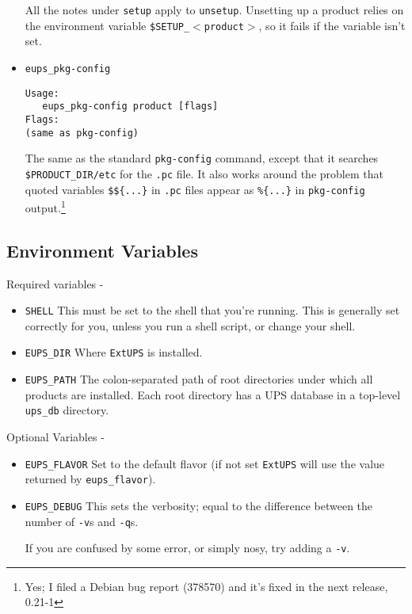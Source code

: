 \documentclass{article}
\newcommand{\code}[1]{\texttt{#1}}
\newcommand{\eups}{\code{ExtUPS}}
\begin{document}
\begin{itemize}
All the notes under \code{setup} apply to
\code{unsetup}. Unsetting up a product relies on the environment
variable \code{\$SETUP\_$<$product$>$}, so it fails if the variable
isn't set.

\item \code{eups\_pkg-config}
\begin{verbatim}
Usage:
   eups_pkg-config product [flags]
Flags:
(same as pkg-config)
\end{verbatim}

The same as the standard \code{pkg-config} command, except that it
searches \code{\$PRODUCT\_DIR/etc} for the \code{.pc} file.  It also
works around the problem that quoted variables \code{\$\$\{...\}}
in \code{.pc} files appear as \code{\%\{...\}} in \code{pkg-config} output.\footnote{
  Yes; I filed a Debian bug report (378570) and it's fixed in the next release, 0.21-1}

\end{itemize}

\subsection{Environment Variables}

Required variables -

\begin{itemize}
  \item \code{SHELL}
    This must be set to the shell that you're running. This is
    generally set correctly for you, unless you run a shell script, or
    change your shell.

  \item \code{EUPS\_DIR}
    Where \eups{} is installed.

  \item \code{EUPS\_PATH}
    The colon-separated path of root directories under which all products are installed.
    Each root directory has a UPS database in a top-level \code{ups\_db} directory.
\end{itemize}

Optional Variables -

\begin{itemize}
  \item \code{EUPS\_FLAVOR}
    Set to the default flavor (if not set \eups{} will use the value returned
    by \code{eups\_flavor}).

  \item \code{EUPS\_DEBUG}
    This sets the verbosity; equal to the difference between the number of \code{-v}s
    and \code{-q}s.

    If you are confused by some error, or simply nosy, try adding a \code{-v}.
\end{itemize}
\end{document}
